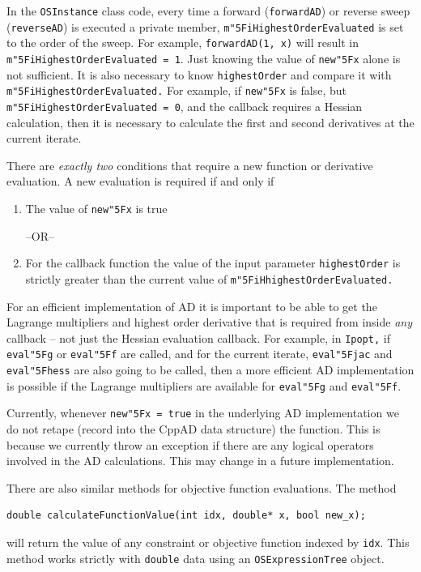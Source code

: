 \documentclass[11pt]{article}
\renewcommand{\_}{{\char"5F}}
\renewcommand{\{}{{\char"7B}}
\renewcommand{\}}{{\char"7D}}
\renewcommand{\^}{{\char"0D}}
\renewcommand{\'}{{\char"0D}}
\begin{document}
\begin{enumerate}[Step 1:]
In the {\tt OSInstance} class code,  every time a forward ({\tt forwardAD}) or reverse sweep ({\tt reverseAD}) 
is executed a private  member, {\tt m\_iHighestOrderEvaluated}  is  set to the order of the sweep. For example, 
{\tt forwardAD(1, x)} will result in {\tt  m\_iHighestOrderEvaluated = 1}.  Just knowing the value  of 
 {\tt new\_x} alone is not sufficient. It is also necessary  to know {\tt highestOrder} and compare it with 
{\tt m\_iHighestOrderEvaluated.}  For example, if  {\tt new\_x}  is  false,  but {\tt m\_iHighestOrderEvaluated = 0},  
and   the callback requires a Hessian calculation, then it is necessary to calculate the first and second derivatives 
at the current iterate.

There are {\it  exactly two} conditions that  require a new function or derivative evaluation.   
A new evaluation is required if and only if

\begin{enumerate}
\item{}   The value of {\tt new\_x} is  true

\begin{center}
 --OR--
\end{center}


\item{} For the callback function the value of the input parameter {\tt highestOrder} is strictly greater 
than the current value  of    {\tt m\_iHhighestOrderEvaluated.}
\end{enumerate}

For an efficient implementation of AD it is important to be able to get the Lagrange multipliers and highest order 
derivative that is required from inside {\it any} callback -- not just the Hessian evaluation callback. 
For example, in {\tt Ipopt,} if  {\tt eval\_g}  or {\tt eval\_f} are called, and  for the current iterate, 
{\tt eval\_jac} and {\tt eval\_hess} are also going to be called, then  a more efficient AD implementation 
is possible if the Lagrange multipliers are available for {\tt eval\_g} and {\tt eval\_f}.

Currently, whenever {\tt new\_x = true} in the underlying AD implementation we do not retape 
(record into the CppAD data structure)  the function. This is because we currently throw an exception 
if there are any logical operators involved in the AD calculations. This may change in a future implementation.


There are also similar methods for objective function evaluations.  The method
\begin{verbatim}
double calculateFunctionValue(int idx, double* x, bool new_x);
\end{verbatim}
 will return the value of any constraint or objective function indexed by {\tt idx}. 
This method works strictly with {\tt double} data using an {\tt OSExpressionTree} object.


\end{enumerate}
\end{document}
